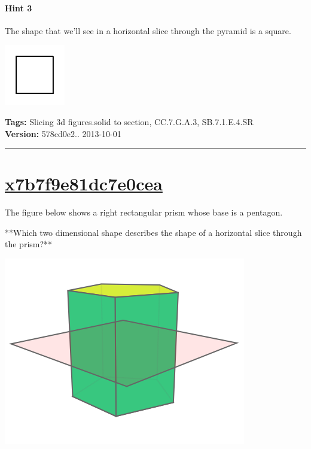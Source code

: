 \documentclass[twocolumn,10pt]{article}
\def\shrinkfactor{0.55}
\begin{document}
\paragraph{Hint 3}The shape that we'll see in a horizontal slice through the pyramid is a square.  

\includegraphics[scale=\shrinkfactor]{figures/4b59a0ece6acc7c19c389e1de534d1df93bf1169.png}



\medskip
\noindent
\textbf{Tags:} {\footnotesize Slicing 3d figures.solid to section, CC.7.G.A.3, SB.7.1.E.4.SR}\\
\textbf{Version:} 578cd0e2.. 2013-10-01
\smallskip\hrule





\section{\href{https://www.khanacademy.org/devadmin/content/items/x7b7f9e81dc7e0cea}{x7b7f9e81dc7e0cea}}

\noindent
The figure below shows a right rectangular prism whose base is a pentagon.

**Which two dimensional shape describes the shape of a horizontal slice through the prism?**  


\includegraphics[scale=\shrinkfactor]{figures/fe9352beb31c400cf0f7b64a1efed2b946206cc4.png}
\end{document}
